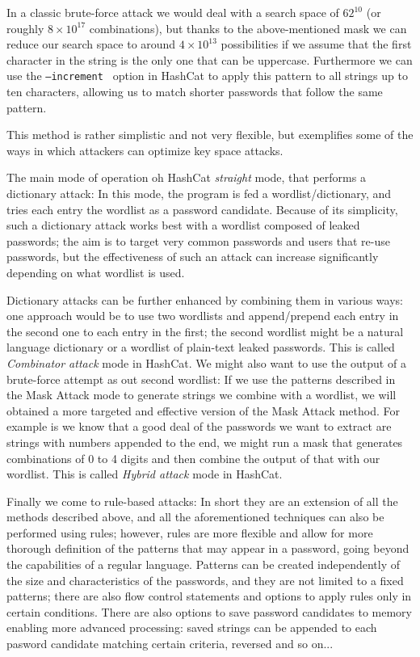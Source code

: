 In a classic brute-force attack we would deal with a search space of $62^{10}$ (or roughly $8 \times 10^{17}$ combinations), but thanks to the above-mentioned mask we can reduce our search space to around $4 \times 10^{13}$ possibilities if we assume that the first character in the string is the only one that can be uppercase.
Furthermore we can use the \texttt{--increment } option in HashCat to apply this pattern to all strings up to ten characters, allowing us to match shorter passwords that follow the same pattern.

This method is rather simplistic and not very flexible, but exemplifies some of the ways in which attackers can optimize key space attacks.\newline

The main mode of operation oh HashCat \emph{straight} mode, that performs a dictionary attack: In this mode, the program is fed a wordlist/dictionary, and tries each entry the wordlist as a password candidate. Because of its simplicity, such a dictionary attack works best with a wordlist composed of leaked passwords; the aim is to target very common passwords and users that re-use passwords, but the effectiveness of such an attack can increase significantly depending on what wordlist is used.

Dictionary attacks can be further enhanced by combining them in various ways: one approach would be to use two wordlists and append/prepend each entry in the second one to each entry in the first; 
the second wordlist might be a natural language dictionary or a wordlist of plain-text leaked passwords. This is called \emph{Combinator attack} mode in HashCat. 
We might also want to use the output of a brute-force attempt as out second wordlist: If we use the patterns described in the Mask Attack mode to generate strings we combine with a wordlist, we will obtained a more targeted and effective version of the Mask Attack method. 
For example is we know that a good deal of the passwords we want to extract are strings with numbers appended to the end, we might run a mask that generates combinations of 0 to 4 digits and then combine the output of that with our wordlist. This is called \emph{Hybrid attack } mode in HashCat.\newline

Finally we come to rule-based attacks: In short they are an extension of all the methods described above, and all the aforementioned techniques can also be performed using rules; however, rules are more flexible and allow for more thorough definition of the patterns that may appear in a password, going beyond the capabilities of a regular language.
Patterns can be created independently of the size and characteristics of the passwords, and they are not limited to a fixed patterns; there are also flow control statements and options to apply rules only in certain conditions.
There are also options to save password candidates to memory enabling more advanced processing: saved strings can be appended to each pasword candidate matching certain criteria, reversed and so on...

